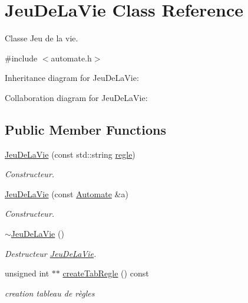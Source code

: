 \hypertarget{class_jeu_de_la_vie}{}\section{Jeu\+De\+La\+Vie Class Reference}
\label{class_jeu_de_la_vie}


Classe Jeu de la vie.  




{\ttfamily \#include $<$automate.\+h$>$}



Inheritance diagram for Jeu\+De\+La\+Vie\+:


Collaboration diagram for Jeu\+De\+La\+Vie\+:
\subsection*{Public Member Functions}
\begin{DoxyCompactItemize}
\item 
\mbox{\hyperlink{class_jeu_de_la_vie_a0288682b1dbed61efe96f6a41850ea29}{Jeu\+De\+La\+Vie}} (const std\+::string \mbox{\hyperlink{class_automate_a7f9e28d421ef41372273778f182e8f22}{regle}})
\begin{DoxyCompactList}\small\item\em Constructeur. \end{DoxyCompactList}\item 
\mbox{\hyperlink{class_jeu_de_la_vie_ae7ddf1c20448c56ef04bd31a332bb1ab}{Jeu\+De\+La\+Vie}} (const \mbox{\hyperlink{class_automate}{Automate}} \&a)
\begin{DoxyCompactList}\small\item\em Constructeur. \end{DoxyCompactList}\item 
\mbox{\hyperlink{class_jeu_de_la_vie_a406ed8cb7b35d3c4a0b77528473e89a4}{$\sim$\+Jeu\+De\+La\+Vie}} ()
\begin{DoxyCompactList}\small\item\em Destructeur \mbox{\hyperlink{class_jeu_de_la_vie}{Jeu\+De\+La\+Vie}}. \end{DoxyCompactList}\item 
unsigned int $\ast$$\ast$ \mbox{\hyperlink{class_jeu_de_la_vie_a8e39a4d09ea17330ac86f0500ed7380e}{create\+Tab\+Regle}} () const
\begin{DoxyCompactList}\small\item\em creation tableau de règles \end{DoxyCompactList}\end{DoxyCompactItemize}
